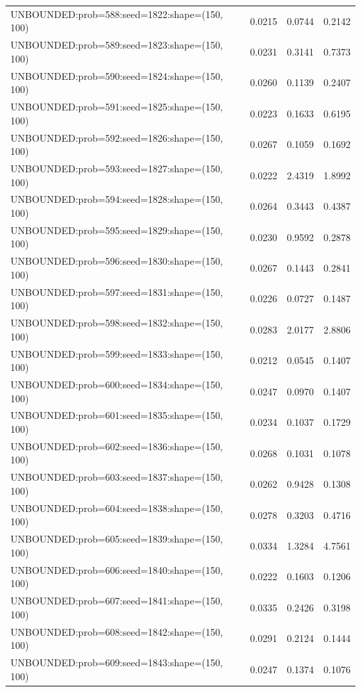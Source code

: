\begin{longtable}{lccc}
UNBOUNDED:prob=588:seed=1822:shape=(150, 100) &   0.0215 &  0.0744 &  0.2142 \\
UNBOUNDED:prob=589:seed=1823:shape=(150, 100) &   0.0231 &  0.3141 &  0.7373 \\
UNBOUNDED:prob=590:seed=1824:shape=(150, 100) &   0.0260 &  0.1139 &  0.2407 \\
UNBOUNDED:prob=591:seed=1825:shape=(150, 100) &   0.0223 &  0.1633 &  0.6195 \\
UNBOUNDED:prob=592:seed=1826:shape=(150, 100) &   0.0267 &  0.1059 &  0.1692 \\
UNBOUNDED:prob=593:seed=1827:shape=(150, 100) &   0.0222 &  2.4319 &  1.8992 \\
UNBOUNDED:prob=594:seed=1828:shape=(150, 100) &   0.0264 &  0.3443 &  0.4387 \\
UNBOUNDED:prob=595:seed=1829:shape=(150, 100) &   0.0230 &  0.9592 &  0.2878 \\
UNBOUNDED:prob=596:seed=1830:shape=(150, 100) &   0.0267 &  0.1443 &  0.2841 \\
UNBOUNDED:prob=597:seed=1831:shape=(150, 100) &   0.0226 &  0.0727 &  0.1487 \\
UNBOUNDED:prob=598:seed=1832:shape=(150, 100) &   0.0283 &  2.0177 &  2.8806 \\
UNBOUNDED:prob=599:seed=1833:shape=(150, 100) &   0.0212 &  0.0545 &  0.1407 \\
UNBOUNDED:prob=600:seed=1834:shape=(150, 100) &   0.0247 &  0.0970 &  0.1407 \\
UNBOUNDED:prob=601:seed=1835:shape=(150, 100) &   0.0234 &  0.1037 &  0.1729 \\
UNBOUNDED:prob=602:seed=1836:shape=(150, 100) &   0.0268 &  0.1031 &  0.1078 \\
UNBOUNDED:prob=603:seed=1837:shape=(150, 100) &   0.0262 &  0.9428 &  0.1308 \\
UNBOUNDED:prob=604:seed=1838:shape=(150, 100) &   0.0278 &  0.3203 &  0.4716 \\
UNBOUNDED:prob=605:seed=1839:shape=(150, 100) &   0.0334 &  1.3284 &  4.7561 \\
UNBOUNDED:prob=606:seed=1840:shape=(150, 100) &   0.0222 &  0.1603 &  0.1206 \\
UNBOUNDED:prob=607:seed=1841:shape=(150, 100) &   0.0335 &  0.2426 &  0.3198 \\
UNBOUNDED:prob=608:seed=1842:shape=(150, 100) &   0.0291 &  0.2124 &  0.1444 \\
UNBOUNDED:prob=609:seed=1843:shape=(150, 100) &   0.0247 &  0.1374 &  0.1076 \\

\end{longtable}
